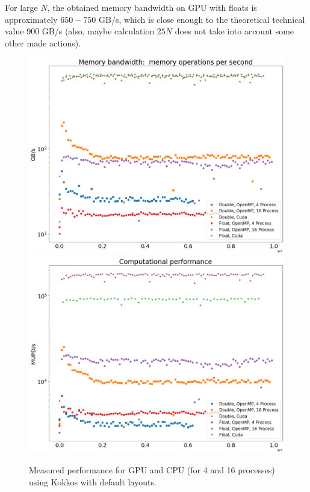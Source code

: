 \documentclass{article}
\begin{document}
For large $N$, the obtained memory bandwidth on GPU with floats is approximately $650-750$ GB/s, which is close enough to the theoretical technical value $900$ GB/s (also, maybe calculation $25N$ does not take into account some other made actions). 


\begin{figure}[h]
	\includegraphics[scale=0.27]{memory.png} 
	\includegraphics[scale=0.27]{comp.png}  
	\caption{ Measured performance for GPU and CPU (for 4 and 16 processes) using Kokkos with default layouts.  }
	\label{doubleorfloat}
\end{figure}
\end{document}
